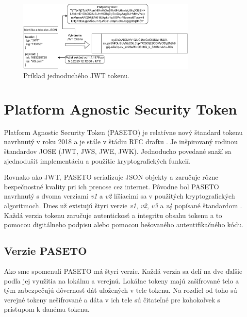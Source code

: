 \begin{figure}
    \centerline{\includegraphics[width=0.8\textwidth]{images/jwt_token}}
    \caption[JWT token]{Príklad jednoduchého JWT tokenu.}
    \label{fig:jwt_token}
\end{figure}


\section{Platform Agnostic Security Token}

Platform Agnostic Security Token (PASETO) je relatívne nový štandard tokenu navrhnutý v roku 2018 a je stále v štádiu RFC draftu \cite{paseto_rfc}. Je inšpirovaný rodinou štandardov JOSE (JWT, JWS, JWE, JWK). Jednoducho povedané snaží sa zjednodušiť implementáciu a použitie kryptografických funkcií.

Rovnako ako JWT, PASETO serializuje JSON objekty a zaručuje rôzne bezpečnostné kvality pri ich prenose cez internet. Pôvodne bol PASETO navrhnutý s dvoma verziami \textit{v1} a \textit{v2} líšiacimi sa v použitých kryptografických algoritmoch. Dnes už existujú štyri verzie \textit{v1}, \textit{v2}, \textit{v3} a \textit{v4} popísané štandardom \cite{paseto_git}. Každá verzia tokenu zaručuje autentickosť a integritu obsahu tokenu a to pomocou digitálneho podpisu alebo pomocou hešovaného autentifikačného kódu.

\subsection{Verzie PASETO}

Ako sme spomenuli PASETO má štyri verzie. Každá verzia sa delí na dve ďalšie podľa jej využitia na lokálnu a verejnú. Lokálne tokeny majú zašifrované telo a tým zabezpečujú dôvernosť dát uložených v tele tokenu. Na rozdiel od toho sú verejné tokeny nešifrované a dáta v ich tele sú čitateľné pre kohokoľvek s prístupom k danému tokenu.

